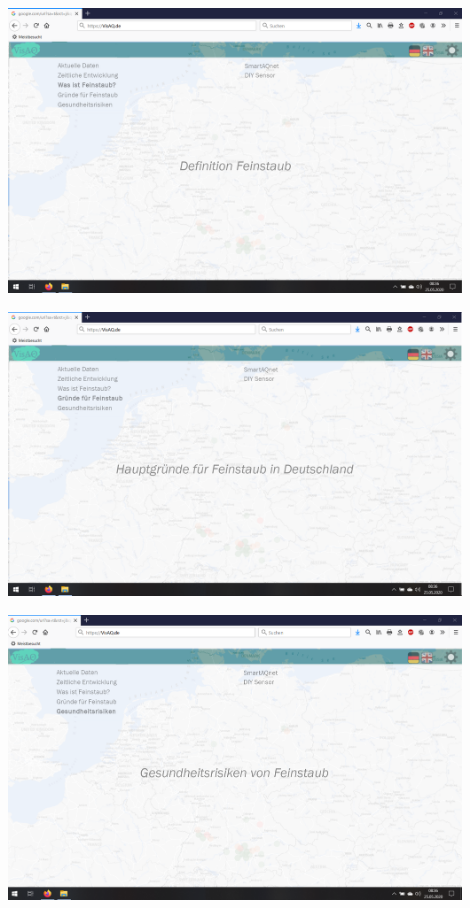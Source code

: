 \begin{center}
	\includegraphics[width=0.9\textwidth]{Screenshots/Definition-von-Feinstaub} 
	
	\includegraphics[width=0.9\textwidth]{Screenshots/Gruende-Feinstaub} 
	
	\includegraphics[width=0.9\textwidth]{Screenshots/Gesundheitsrisiken} 
	

\end{center}
